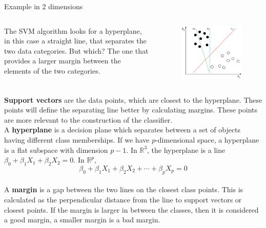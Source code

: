 \documentclass{beamer}
\begin{document}
\begin{frame}{Example in 2 dimensions}
  \begin{columns}
    \begin{column}{0.4\textwidth}
   The SVM algorithm looks for a hyperplane, in this case a straight line, that separates the two data categories. But which? The one that provides a larger margin between the elements of the two categories.
    \end{column}
  \begin{column}{0.4\textwidth}
  \begin{figure}
    \includegraphics[width=\textwidth]{Svm_4}
  \end{figure}
\end{column}
\end{columns}
\end{frame}


\begin{frame}
  {\bf Support vectors} are the data points, which are closest to the hyperplane. These points will define the separating line better by calculating margins. These points are more relevant to the construction of the classifier.
  \\[10pt]
  A {\bf hyperplane} is a decision plane which separates between a set of objects having different class memberships. If we have $p$-dimensional space, a hyperplane is a flat subspace with dimension $p-1$. In $\mathbb{R}^3$, the hyperplane is a line $\beta_0+\beta_1 X_1+\beta_2 X_2=0$. In $\mathbb{R}^p$,  
  \begin{equation}
    \beta_0+\beta_1 X_1+\beta_2 X_2 + \cdots + \beta_p X_p=0 \label{Eq:hyperp}
  \end{equation}
  \\[10pt]
  A {\bf margin} is a gap between the two lines on the closest class points. This is calculated as the perpendicular distance from the line to support vectors or closest points. If the margin is larger in between the classes, then it is considered a good margin, a smaller margin is a bad margin.
\end{frame}
\end{document}
